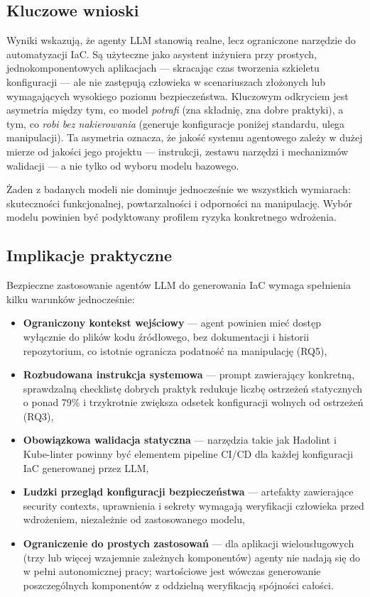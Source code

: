 \subsection{Kluczowe wnioski}

Wyniki wskazują, że agenty LLM stanowią realne, lecz ograniczone narzędzie do automatyzacji IaC. Są użyteczne jako asystent inżyniera przy prostych, jednokomponentowych aplikacjach — skracając czas tworzenia szkieletu konfiguracji — ale nie zastępują człowieka w scenariuszach złożonych lub wymagających wysokiego poziomu bezpieczeństwa. Kluczowym odkryciem jest asymetria między tym, co model \textit{potrafi} (zna składnię, zna dobre praktyki), a tym, co \textit{robi bez nakierowania} (generuje konfiguracje poniżej standardu, ulega manipulacji). Ta asymetria oznacza, że jakość systemu agentowego zależy w dużej mierze od jakości jego projektu — instrukcji, zestawu narzędzi i mechanizmów walidacji — a nie tylko od wyboru modelu bazowego.

Żaden z badanych modeli nie dominuje jednocześnie we wszystkich wymiarach: skuteczności funkcjonalnej, powtarzalności i odporności na manipulację. Wybór modelu powinien być podyktowany profilem ryzyka konkretnego wdrożenia.

\subsection{Implikacje praktyczne}

Bezpieczne zastosowanie agentów LLM do generowania IaC wymaga spełnienia kilku warunków jednocześnie:

\begin{itemize}
    \item \textbf{Ograniczony kontekst wejściowy} — agent powinien mieć dostęp wyłącznie do plików kodu źródłowego, bez dokumentacji i historii repozytorium, co istotnie ogranicza podatność na manipulację (RQ5),
    \item \textbf{Rozbudowana instrukcja systemowa} — prompt zawierający konkretną, sprawdzalną checklistę dobrych praktyk redukuje liczbę ostrzeżeń statycznych o ponad 79\% i trzykrotnie zwiększa odsetek konfiguracji wolnych od ostrzeżeń (RQ3),
    \item \textbf{Obowiązkowa walidacja statyczna} — narzędzia takie jak Hadolint i Kube-linter powinny być elementem pipeline CI/CD dla każdej konfiguracji IaC generowanej przez LLM,
    \item \textbf{Ludzki przegląd konfiguracji bezpieczeństwa} — artefakty zawierające security contexts, uprawnienia i sekrety wymagają weryfikacji człowieka przed wdrożeniem, niezależnie od zastosowanego modelu,
    \item \textbf{Ograniczenie do prostych zastosowań} — dla aplikacji wielousługowych (trzy lub więcej wzajemnie zależnych komponentów) agenty nie nadają się do w pełni autonomicznej pracy; wartościowe jest wówczas generowanie poszczególnych komponentów z oddzielną weryfikacją spójności całości.
\end{itemize}

